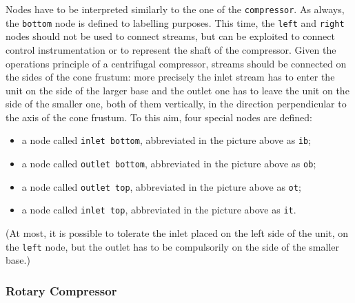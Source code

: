 \documentclass[12pt]{article}						%
\newcommand*{\chpn}[1]{\texttt{#1}}				%
\newcommand*{\chpp}[1]{\texttt{#1}}				%
\begin{document}
Nodes have to be interpreted similarly to the one of the \chpp{compressor}. As
always, the \chpn{bottom} node is defined to labelling purposes. This time, the
\chpn{left} and \chpn{right} nodes should not be used to connect streams, but can
be exploited to connect control instrumentation or to represent the shaft of the
compressor. Given the operations principle of a centrifugal compressor, streams
should be connected on the sides of the cone frustum: more precisely the inlet
stream has to enter the unit on the side of the larger base and the outlet one
has to leave the unit on the side of the smaller one, both of them vertically, in
the direction perpendicular to the axis of the cone frustum. To this aim, four
special nodes are defined:
\begin{itemize}
	\item a node called \chpn{inlet bottom}, abbreviated in the picture above as
		\chpn{ib};
	\item a node called \chpn{outlet bottom}, abbreviated in the picture above as
		\chpn{ob};
	\item a node called \chpn{outlet top}, abbreviated in the picture above as
		\chpn{ot};
	\item a node called \chpn{inlet top}, abbreviated in the picture above as
		\chpn{it}.
\end{itemize}
(At most, it is possible to tolerate the inlet placed on the left side of the
unit, on the \chpn{left} node, but the outlet has to be compulsorily on the side
of the smaller base.)

\subsubsection{Rotary Compressor}
\end{document}
